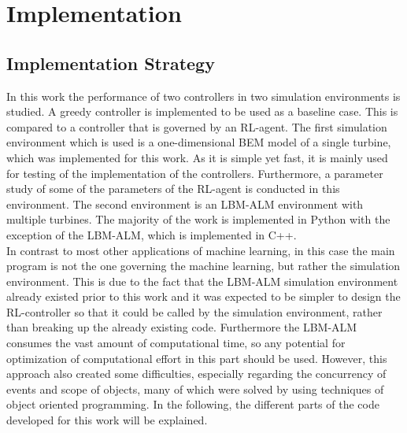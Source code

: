 \section{Implementation}
\subsection{Implementation Strategy}
In this work the performance of two controllers in two simulation environments is studied. A greedy controller is implemented to be used as a baseline case. This is compared to a controller that is governed by an RL-agent. The first simulation environment which is used is a one-dimensional BEM model of a single turbine, which was implemented for this work. As it is simple yet fast, it is mainly used for testing of the implementation of the controllers. Furthermore, a parameter study of some of the parameters of the RL-agent is conducted in this environment. The second environment is an LBM-ALM environment with multiple turbines. The majority of the work is implemented in Python with the exception of the LBM-ALM, which is implemented in C++.\\
In contrast to most other applications of machine learning, in this case the main program is not the one governing the machine learning, but rather the simulation environment. This is due to the fact that the LBM-ALM simulation environment already existed prior to this work and it was expected to be simpler to design the RL-controller so that it could be called by the simulation environment, rather than breaking up the already existing code. Furthermore the LBM-ALM consumes the vast amount of computational time, so any potential for optimization of computational effort in this part should be used. However, this approach also created some difficulties, especially regarding the concurrency of events and scope of objects, many of which were solved by using techniques of object oriented programming. In the following, the different parts of the code developed for this work will be explained.
